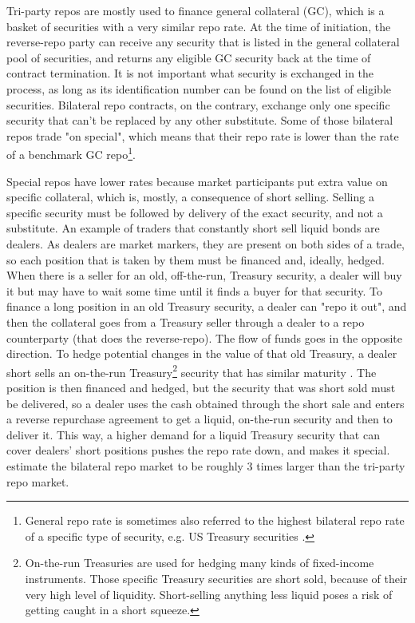 \documentclass[11pt,a4paper,english,oneside]{article}
\begin{document}
Tri-party repos are mostly used to finance general collateral (GC), which is a basket of securities with a very similar repo rate. At the time of initiation, the reverse-repo party can receive any security that is listed in the general collateral pool of securities, and returns any eligible GC security back at the time of contract termination. It is not important what security is exchanged in the process, as long as its identification number can be found on the list of eligible securities. Bilateral repo contracts, on the contrary, exchange only one specific security that can't be replaced by any other substitute. Some of those bilateral repos trade "on special", which means that their repo rate is lower than the rate of a benchmark GC repo\footnote{General repo rate is sometimes also referred to the highest bilateral repo rate of a specific type of security, e.g. US Treasury securities \citep{duffie1996}.}.

Special repos have lower rates because market participants put extra value on specific collateral, which is, mostly, a consequence of short selling. Selling a specific security must be followed by delivery of the exact security, and not a substitute. An example of traders that constantly short sell liquid bonds are dealers. As dealers are market markers, they are present on both sides of a trade, so each position that is taken by them must be financed and, ideally, hedged. When there is a seller for an old, off-the-run, Treasury security, a dealer will buy it but may have to wait some time until it finds a buyer for that security. To finance a long position in an old Treasury security, a dealer can "repo it out", and then the collateral goes from a Treasury seller through a dealer to a repo counterparty (that does the reverse-repo). The flow of funds goes in the opposite direction. To hedge potential changes in the value of that old Treasury, a dealer short sells an on-the-run Treasury\footnote{On-the-run Treasuries are used for hedging many kinds of fixed-income instruments. Those specific Treasury securities are short sold, because of their very high level of liquidity. Short-selling anything less liquid poses a risk of getting caught in a short squeeze.} security that has similar maturity \citep{fisher2002}. The position is then financed and hedged, but the security that was short sold must be delivered, so a dealer uses the cash obtained through the short sale and enters a reverse repurchase agreement to get a liquid, on-the-run security and then to deliver it. This way, a higher demand for a liquid Treasury security that can cover dealers' short positions pushes the repo rate down, and makes it special. \citet{gorton2012} estimate the bilateral repo market to be roughly 3 times larger than the tri-party repo market.
\end{document}
